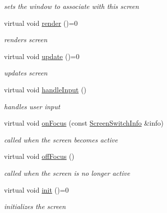 \begin{DoxyCompactItemize}
\begin{DoxyCompactList}\small\item\em sets the window to associate with this screen \end{DoxyCompactList}\item 
\mbox{\label{classnta_1_1Screen_a323ff61ac31f55bd39fa818ccd8200fb}} 
virtual void \hyperlink{classnta_1_1Screen_a323ff61ac31f55bd39fa818ccd8200fb}{render} ()=0
\begin{DoxyCompactList}\small\item\em renders screen \end{DoxyCompactList}\item 
\mbox{\label{classnta_1_1Screen_a6892f9b74b033d8bd5f4e9f190d49efa}} 
virtual void \hyperlink{classnta_1_1Screen_a6892f9b74b033d8bd5f4e9f190d49efa}{update} ()=0
\begin{DoxyCompactList}\small\item\em updates screen \end{DoxyCompactList}\item 
\mbox{\label{classnta_1_1Screen_a645ccabe314f6c9084b493617c3eeafe}} 
virtual void \hyperlink{classnta_1_1Screen_a645ccabe314f6c9084b493617c3eeafe}{handle\+Input} ()
\begin{DoxyCompactList}\small\item\em handles user input \end{DoxyCompactList}\item 
\mbox{\label{classnta_1_1Screen_a895548cdf2a5170d671983fc9189579a}} 
virtual void \hyperlink{classnta_1_1Screen_a895548cdf2a5170d671983fc9189579a}{on\+Focus} (const \hyperlink{structnta_1_1ScreenSwitchInfo}{Screen\+Switch\+Info} \&info)
\begin{DoxyCompactList}\small\item\em called when the screen becomes active \end{DoxyCompactList}\item 
\mbox{\label{classnta_1_1Screen_a172d24c2224aef718d151b621379def1}} 
virtual void \hyperlink{classnta_1_1Screen_a172d24c2224aef718d151b621379def1}{off\+Focus} ()
\begin{DoxyCompactList}\small\item\em called when the screen is no longer active \end{DoxyCompactList}\item 
\mbox{\label{classnta_1_1Screen_ae749bdd554cea6beb81ed8bcd1cd4ed1}} 
virtual void \hyperlink{classnta_1_1Screen_ae749bdd554cea6beb81ed8bcd1cd4ed1}{init} ()=0
\begin{DoxyCompactList}\small\item\em initializes the screen \end{DoxyCompactList}\end{DoxyCompactItemize}
